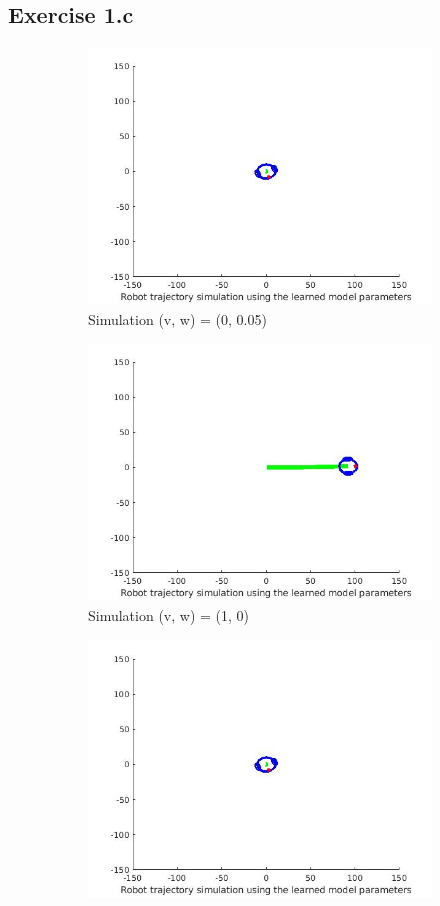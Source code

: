\documentclass{article}
\begin{document}
\subsection*{Exercise 1.c}
\begin{figure}[ht]
	\begin{subfigure}{.5\textwidth}
		\centering
		\includegraphics[width=.8\linewidth]{1.jpg}  
		\caption{Simulation (v, w) = (0, 0.05)}
		\label{fig:sub-first}
	\end{subfigure}
	\begin{subfigure}{.5\textwidth}
		\centering
		\includegraphics[width=.8\linewidth]{2.jpg}  
		\caption{Simulation (v, w) = (1, 0)}
		\label{fig:sub-second}
	\end{subfigure}
	\begin{subfigure}{.5\textwidth}
		\centering
		\includegraphics[width=.8\linewidth]{1.jpg}  

\end{subfigure}
\end{figure}
\end{document}
